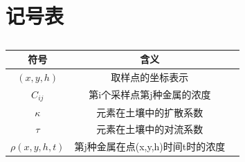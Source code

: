 \documentclass[a4paper]{article}
\begin{document}
\section*{记号表}
\begin{table}[H]
	\centering
	\caption{}
	\label{tab:problem1_symbols}
	\begin{tabular}{ccc}
		\hline
		符号 & 含义  \\
		\hline
		$(x,y,h)$ &取样点的坐标表示   \\
		$C_{ij}$ & 第i个采样点第j种金属的浓度  \\
         $\kappa$ & 元素在土壤中的扩散系数      \\
		$\tau$   & 元素在土壤中的对流系数      \\
		$\rho(x,y,h,t)$   & 第j种金属在点(x,y,h)时间t时的浓度 \\	
	\end{tabular} \\
\end{table}
\end{document}
